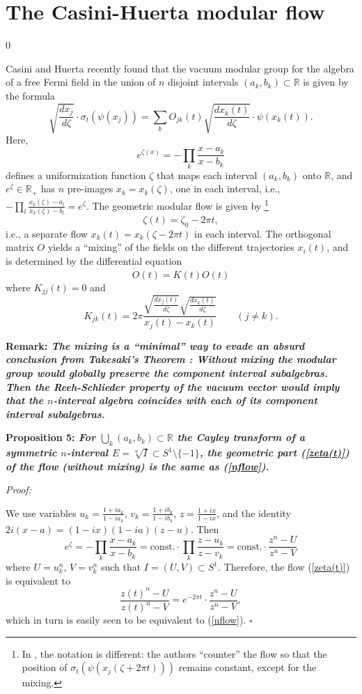 \documentclass[12pt]{article}
\def \RR {{\mathbb R}}
\def\const{\mathrm{const.}}
\def\be{\begin{equation}} \def\bea{\begin{eqnarray}}
\def\ee{\end{equation}}\def\ea{\end{array}}
\def \QED {\hspace*{\fill}$\square$\medskip}
\begin{document}
\section{The Casini-Huerta modular flow}
\label{sec:CH}
\setcounter{equation}0

Casini and Huerta recently found \cite{CH} that the vacuum modular
group for the algebra of a free Fermi field in the union of $n$
disjoint intervals $(a_k,b_k)\subset\RR$ is given by the formula
\be
\label{CHflow}
  \sqrt{\textstyle\frac{dx_j}{d\zeta}}\cdot \sigma_t(\psi(x_j)) =
  \sum_{k} O_{jk}(t) \sqrt{\textstyle\frac{dx_k(t)}{d\zeta}} \cdot
  \psi(x_k(t)).
\ee 
Here, 
\be
\label{zeta} 
   e^{\zeta(x)}=-\prod_k\frac{x-a_k}{x-b_k}
\ee
defines a uniformization function $\zeta$ that maps each interval
$(a_k,b_k)$ onto $\RR$, and $e^\zeta\in\RR_+$ has $n$ pre-images
$x_k=x_k(\zeta)$, one in each interval, i.e.,
$-\prod_l\frac{x_k(\zeta)-a_l}{x_k(\zeta)-b_l}=e^\zeta$. The geometric
modular flow is given by%
\footnote{In \cite{CH}, the notation is different: the authors
  ``counter'' the flow so that the position of
  $\sigma_t(\psi(x_j(\zeta+2\pi t)))$ remains constant, except for the
  mixing.} 
\be
  \label{zeta(t)}
\zeta(t)=\zeta_0-2\pi t,
\ee
i.e., a separate flow $x_k(t)=x_k(\zeta-2\pi t)$ in each interval. The
orthogonal matrix $O$ yields a ``mixing'' of the fields on the different 
trajectories $x_i(t)$, and is determined by the differential equation 
\be
\label{mixdiff} 
   \dot O(t) = K(t)O(t) 
\ee
where $K_{jj}(t)=0$ and 
\be
   K_{jk}(t) = 2\pi \frac{\sqrt{\frac{dx_j(t)}{d\zeta}}
   \sqrt{\frac{dx_k(t)}{d\zeta}}}{x_j(t)-x_k(t)} \qquad
   (j\neq k).
\ee


{\bf Remark: \sl The mixing is a ``minimal'' way to evade an
  absurd conclusion from Takesaki's Theorem \cite[Chap.\ IX, Thm.\
  4.2]{T}: Without mixing the modular group would globally preserve
  the component interval subalgebras. Then the Reeh-Schlieder
  property of the vacuum vector would imply that the $n$-interval
  algebra coincides with each of its component interval subalgebras.} 

\medskip

{\bf Proposition 5: \sl For $\bigcup_{k}(a_k,b_k)\subset \RR$ the
  Cayley transform of a symmetric $n$-interval $E=\sqrt[n] I\subset
  S^1\setminus\{-1\}$, the geometric part (\ref{zeta(t)}) of the flow
  (without mixing) is the same as (\ref{nflow}).  

\medskip

\it Proof:} We use variables $u_k=\frac{1+ia_k}{1-ia_k}$,
$v_k=\frac{1+ib_k}{1-ib_k}$, $z=\frac{1+ix}{1-ix}$, and the identity
$2i(x-a) = (1-ix)(1-ia)(z-u)$. Then
\be 
  e^\zeta = -\prod_k\frac{x-a_k}{x-b_k} =
  \const\cdot\prod_k\frac{z-u_k}{z-v_k} = \const\cdot
  \frac{z^n-U}{z^n-V}
\ee
where $U=u_k^n$, $V=v_k^n$ such that $I=(U,V)\subset S^1$. 
Therefore, the flow (\ref{zeta(t)}) is equivalent to 
\be
\label{zt} 
  \frac{z(t)^n-U}{z(t)^n-V}= e^{-2\pi t}\cdot\frac{z^n-U}{z^n-V},
\ee
which in turn is easily seen to be equivalent to (\ref{nflow}). 
\QED
\end{document}
